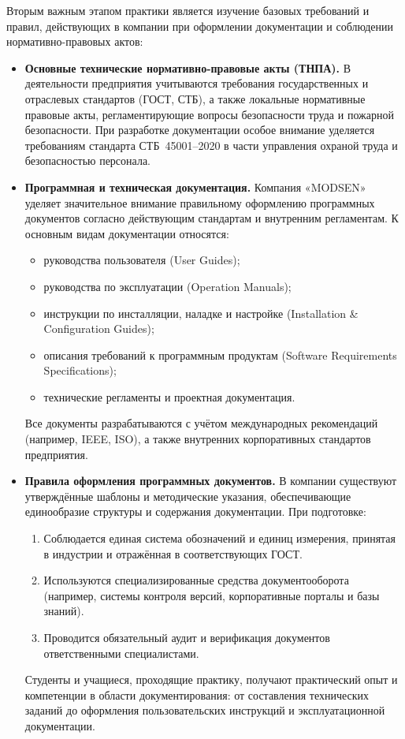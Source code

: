 Вторым важным этапом практики является изучение базовых требований и правил, действующих в компании при оформлении документации и соблюдении нормативно-правовых актов:
\begin{itemize}
    \item \textbf{Основные технические нормативно-правовые акты (ТНПА).} 
    В деятельности предприятия учитываются требования государственных и отраслевых стандартов (ГОСТ, СТБ), а также локальные нормативные правовые акты, регламентирующие вопросы безопасности труда и пожарной безопасности. При разработке документации особое внимание уделяется требованиям стандарта СТБ~45001--2020 в части управления охраной труда и безопасностью персонала.

    \item \textbf{Программная и техническая документация.} 
    Компания «MODSEN» уделяет значительное внимание правильному оформлению программных документов согласно действующим стандартам и внутренним регламентам. К основным видам документации относятся:
    \begin{itemize}
        \item руководства пользователя (User Guides);
        \item руководства по эксплуатации (Operation Manuals);
        \item инструкции по инсталляции, наладке и настройке (Installation \& Configuration Guides);
        \item описания требований к программным продуктам (Software Requirements Specifications);
        \item технические регламенты и проектная документация.
    \end{itemize}
    Все документы разрабатываются с учётом международных рекомендаций (например, IEEE, ISO), а также внутренних корпоративных стандартов предприятия.

    \item \textbf{Правила оформления программных документов.}
    В компании существуют утверждённые шаблоны и методические указания, обеспечивающие единообразие структуры и содержания документации. При подготовке:
    \begin{enumerate}
        \item Соблюдается единая система обозначений и единиц измерения, принятая в индустрии и отражённая в соответствующих ГОСТ.
        \item Используются специализированные средства документооборота (например, системы контроля версий, корпоративные порталы и базы знаний).
        \item Проводится обязательный аудит и верификация документов ответственными специалистами.
    \end{enumerate}
    Студенты и учащиеся, проходящие практику, получают практический опыт и компетенции в области документирования: от составления технических заданий до оформления пользовательских инструкций и эксплуатационной документации.
\end{itemize}

